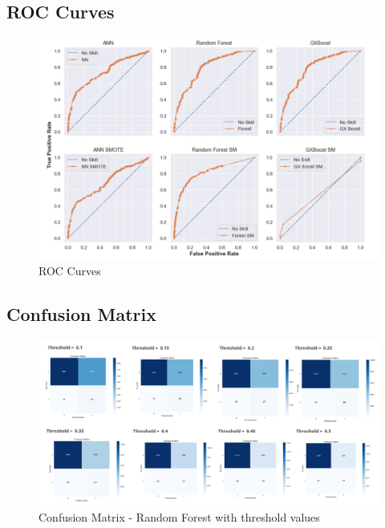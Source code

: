 
\hspace*{5cm}
\subsection{ROC Curves}
\begin{figure}[H]
    \centering
    \includegraphics[width=\linewidth]{figures/roc_res_full.PNG}
    \caption{ROC Curves }
    \label{fig:ROC_full_APX}
\end{figure}

\hspace*{5cm}
\subsection{Confusion Matrix}
\begin{figure}[H]
    \centering
    \includegraphics[width=\linewidth]{figures/cm_rf_th.PNG}
    \caption{Confusion Matrix - Random Forest with threshold values}
    \label{fig:cm_rf_full}
\end{figure}


\hspace*{25cm}
